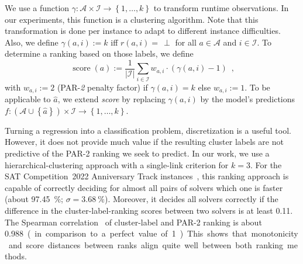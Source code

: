 \documentclass[runningheads]{llncs}
\begin{document}
We use a function $\gamma\!: {\mathcal{A} \times \mathcal{I}} \rightarrow \left\lbrace 1, \dots, k \right\rbrace$ to transform runtime observations.
In our experiments, this function is a clustering algorithm.
Note that this transformation is done per instance to adapt to different instance difficulties. 
Also, we define ${\gamma\!\left(a, i\right) := k}$ iff $r\!\left(a, i\right) = \,\perp$ for all $a \in \mathcal{A}$ and $i \in \mathcal{I}$.
To determine a ranking based on those labels, we define
\begin{equation}
  \operatorname{score}\!\left(a\right) := \frac{1}{|\mathcal{I}|} \sum_{i \in \mathcal{I}} w_{a,i} \cdot \left(\gamma\!\left(a, i\right) - 1\right) \enspace \textrm{,}
  \label{eq:rankingeq}
\end{equation}
with $w_{a,i} := 2$ (PAR-\emph{2} penalty factor) if $\gamma\!\left(a, i\right) = k$ else $w_{a,i} := 1$.
To be applicable to $\hat{a}$, we extend \emph{score} by replacing $\gamma\!\left(a, i\right)$ by the model's predictions $f\!: \left(\mathcal{A} \cup \left\lbrace \hat{a} \right\rbrace\right) \times \mathcal{I} \rightarrow \left\lbrace 1, \dots, k \right\rbrace$.

Turning a regression into a classification problem, discretization is a useful tool.
However, it does not provide much value if the resulting cluster labels are not predictive of the PAR-2 ranking we seek to predict.
In our work, we use a hierarchical-clustering approach with a single-link criterion for $k = 3$.
For the SAT Competition~2022 Anniversary Track instances~\cite{sat2022}, this ranking approach is capable of correctly deciding for almost all pairs of solvers which one is faster (about \SI{97.45}{\%}; $\sigma = \SI{3.68}{\%}$).
Moreover, it decides all solvers correctly if the difference in the cluster-label-ranking scores between two solvers is at least \SI{0.11}{}.
The Spearman correlation~\cite{de2016comparing} of cluster-label and PAR-2 ranking is about \SI{0.988} (in comparison to a perfect value of \SI{1}).
This shows that monotonicity and score distances between ranks align quite well between both ranking methods.
\end{document}
